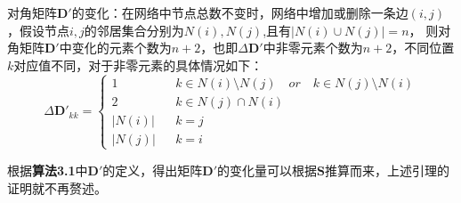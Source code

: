 \begin{lemma}
	{对角矩阵$\textbf{D}'$的变化}：在网络中节点总数不变时，网络中增加或删除一条边$(i,j)$，假设节点$i,j$的邻居集合分别为$N(i), N(j)$,且有$|N(i) \cup N(j)|=n$， 则对角矩阵$\textbf{D}'$中变化的元素个数为$n+2$，也即$\Delta\textbf{D}'$中非零元素个数为$n+2$，不同位置$k$对应值不同，对于非零元素的具体情况如下：
	\begin{equation}
		\Delta\textbf{D}'_{kk}=\left\{
		\begin{array}{ccl}
		1       &      & k\in N(i)\setminus N(j)\quad or\quad  k\in N(j)\setminus N(i)\\
		2     &      & k\in N(j) \cap N(i)\\
		|N(i)|     &      & k=j\\
		|N(j)|       &      & k=i 
		\end{array} \right.
	\end{equation}
\end{lemma}
根据\textbf{算法3.1}中$\textbf{D}'$的定义，得出矩阵$\textbf{D}'$的变化量可以根据$\textbf{S}$推算而来，上述引理的证明就不再赘述。

